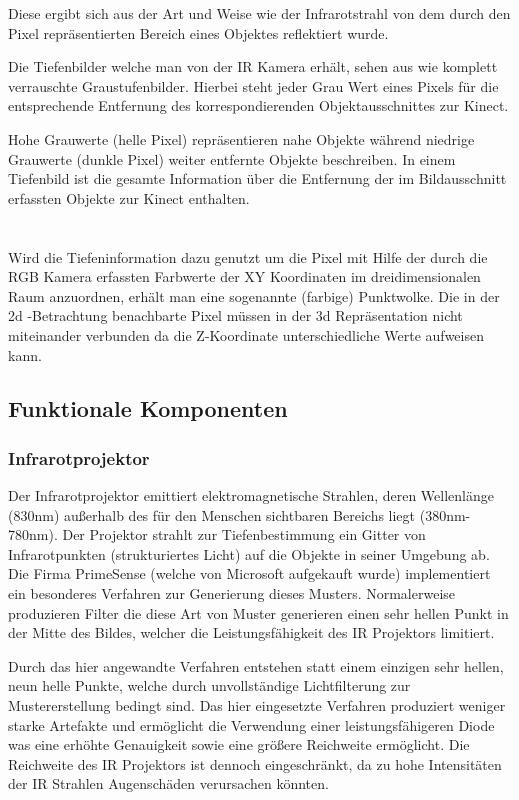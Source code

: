  Diese ergibt sich aus der Art und Weise wie der Infrarotstrahl von dem durch den Pixel repräsentierten Bereich eines Objektes reflektiert wurde.



Die Tiefenbilder welche man von der IR Kamera erhält, sehen aus wie komplett verrauschte Graustufenbilder. Hierbei steht jeder Grau Wert eines Pixels für die entsprechende Entfernung des korrespondierenden Objektausschnittes zur Kinect.




Hohe Grauwerte (helle Pixel) repräsentieren nahe Objekte während niedrige Grauwerte (dunkle Pixel) weiter entfernte Objekte beschreiben. In einem Tiefenbild ist die gesamte Information über die Entfernung der im Bildausschnitt erfassten Objekte zur Kinect enthalten.\\ \\ \\

 Wird die Tiefeninformation dazu genutzt um die Pixel mit Hilfe der durch die RGB Kamera erfassten Farbwerte der XY Koordinaten im dreidimensionalen Raum anzuordnen, erhält man eine sogenannte (farbige) Punktwolke. Die in der 2d 
-Betrachtung benachbarte Pixel müssen in der 3d Repräsentation nicht miteinander verbunden da die Z-Koordinate unterschiedliche Werte aufweisen kann.
\subsection{Funktionale Komponenten}
\subsubsection{Infrarotprojektor}

Der Infrarotprojektor emittiert elektromagnetische Strahlen, deren Wellenlänge (830nm) außerhalb des für den Menschen sichtbaren Bereichs liegt (380nm-780nm).
Der Projektor strahlt zur Tiefenbestimmung ein Gitter von Infrarotpunkten (strukturiertes Licht) auf die Objekte in seiner Umgebung ab. 
Die Firma PrimeSense (welche von Microsoft aufgekauft wurde) implementiert ein besonderes Verfahren zur Generierung dieses Musters.
Normalerweise produzieren Filter die diese Art von Muster generieren einen sehr hellen Punkt in der Mitte des Bildes, welcher die Leistungsfähigkeit des IR Projektors limitiert.


Durch das hier angewandte Verfahren entstehen statt einem einzigen sehr hellen, neun helle Punkte, welche durch unvollständige Lichtfilterung zur Mustererstellung bedingt sind. Das hier eingesetzte Verfahren produziert weniger starke Artefakte und ermöglicht die Verwendung einer leistungsfähigeren Diode was eine erhöhte Genauigkeit sowie eine größere Reichweite ermöglicht. Die Reichweite des IR Projektors ist dennoch eingeschränkt, da zu hohe Intensitäten der IR Strahlen Augenschäden verursachen könnten.


